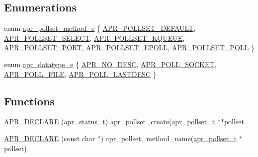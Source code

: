 \subsection*{Enumerations}
\begin{DoxyCompactItemize}
\item 
enum \mbox{\hyperlink{group__apr__poll_gabe6f1238ea45e9425fa052e2788e4a29}{apr\+\_\+pollset\+\_\+method\+\_\+e}} \{ \newline
\mbox{\hyperlink{group__apr__poll_ggabe6f1238ea45e9425fa052e2788e4a29ae68b155914b79d4a58519675dfc24d94}{A\+P\+R\+\_\+\+P\+O\+L\+L\+S\+E\+T\+\_\+\+D\+E\+F\+A\+U\+LT}}, 
\mbox{\hyperlink{group__apr__poll_ggabe6f1238ea45e9425fa052e2788e4a29aa6613bebee1abb348da2a153f91c738e}{A\+P\+R\+\_\+\+P\+O\+L\+L\+S\+E\+T\+\_\+\+S\+E\+L\+E\+CT}}, 
\mbox{\hyperlink{group__apr__poll_ggabe6f1238ea45e9425fa052e2788e4a29a2722387d6523f8f02cec7c31a45966d4}{A\+P\+R\+\_\+\+P\+O\+L\+L\+S\+E\+T\+\_\+\+K\+Q\+U\+E\+UE}}, 
\mbox{\hyperlink{group__apr__poll_ggabe6f1238ea45e9425fa052e2788e4a29aec66f6da923595ff0a6fa20f4bc41e46}{A\+P\+R\+\_\+\+P\+O\+L\+L\+S\+E\+T\+\_\+\+P\+O\+RT}}, 
\newline
\mbox{\hyperlink{group__apr__poll_ggabe6f1238ea45e9425fa052e2788e4a29a142ebdcab58ccfabd5d964ff3ab476ab}{A\+P\+R\+\_\+\+P\+O\+L\+L\+S\+E\+T\+\_\+\+E\+P\+O\+LL}}, 
\mbox{\hyperlink{group__apr__poll_ggabe6f1238ea45e9425fa052e2788e4a29aa8c0b4c036644ea4518f8d7c2fd4fe8e}{A\+P\+R\+\_\+\+P\+O\+L\+L\+S\+E\+T\+\_\+\+P\+O\+LL}}
 \}
\item 
enum \mbox{\hyperlink{group__apr__poll_ga0a8549d84c1721788b102a4cc8b4b0f0}{apr\+\_\+datatype\+\_\+e}} \{ \mbox{\hyperlink{group__apr__poll_gga0a8549d84c1721788b102a4cc8b4b0f0aeb85f43492052bf0788d31f6dd85a222}{A\+P\+R\+\_\+\+N\+O\+\_\+\+D\+E\+SC}}, 
\mbox{\hyperlink{group__apr__poll_gga0a8549d84c1721788b102a4cc8b4b0f0a3629c5b3166fde91792f2f913fbd72f0}{A\+P\+R\+\_\+\+P\+O\+L\+L\+\_\+\+S\+O\+C\+K\+ET}}, 
\mbox{\hyperlink{group__apr__poll_gga0a8549d84c1721788b102a4cc8b4b0f0a8351d461bf66b706232962fd02e84202}{A\+P\+R\+\_\+\+P\+O\+L\+L\+\_\+\+F\+I\+LE}}, 
\mbox{\hyperlink{group__apr__poll_gga0a8549d84c1721788b102a4cc8b4b0f0a413b387c7fe1ca7b096d46dfd9942fe5}{A\+P\+R\+\_\+\+P\+O\+L\+L\+\_\+\+L\+A\+S\+T\+D\+E\+SC}}
 \}
\end{DoxyCompactItemize}
\subsection*{Functions}
\begin{DoxyCompactItemize}
\item 
\mbox{\hyperlink{group__apr__poll_gad3f3d7d056f3af6d55a5a7385637c918}{A\+P\+R\+\_\+\+D\+E\+C\+L\+A\+RE}} (\mbox{\hyperlink{group__apr__errno_gaf76ee4543247e9fb3f3546203e590a6c}{apr\+\_\+status\+\_\+t}}) apr\+\_\+pollset\+\_\+create(\mbox{\hyperlink{structapr__pollset__t}{apr\+\_\+pollset\+\_\+t}} $\ast$$\ast$pollset
\item 
\mbox{\hyperlink{group__apr__poll_gaef92b86069b7cf1da2ef15b186ec1552}{A\+P\+R\+\_\+\+D\+E\+C\+L\+A\+RE}} (const char $\ast$) apr\+\_\+pollset\+\_\+method\+\_\+name(\mbox{\hyperlink{structapr__pollset__t}{apr\+\_\+pollset\+\_\+t}} $\ast$pollset)
\end{DoxyCompactItemize}
